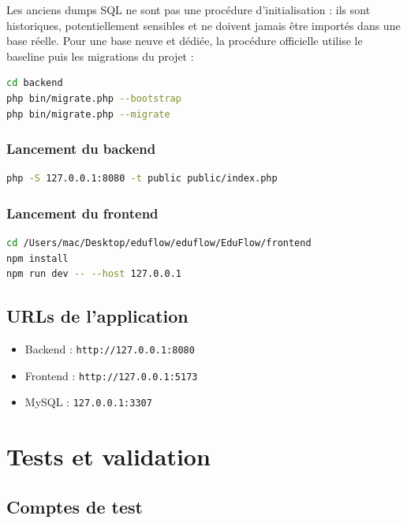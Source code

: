 \documentclass[12pt,a4paper]{report}
\begin{document}
Les anciens dumps SQL ne sont pas une procédure d'initialisation : ils sont
historiques, potentiellement sensibles et ne doivent jamais être importés dans
une base réelle. Pour une base neuve et dédiée, la procédure officielle utilise
le baseline puis les migrations du projet :

\begin{lstlisting}[language=bash]
cd backend
php bin/migrate.php --bootstrap
php bin/migrate.php --migrate
\end{lstlisting}

\subsection{Lancement du backend}

\begin{lstlisting}[language=bash]
php -S 127.0.0.1:8080 -t public public/index.php
\end{lstlisting}

\subsection{Lancement du frontend}

\begin{lstlisting}[language=bash]
cd /Users/mac/Desktop/eduflow/eduflow/EduFlow/frontend
npm install
npm run dev -- --host 127.0.0.1
\end{lstlisting}

\section{URLs de l'application}

\begin{itemize}[label=--]
    \item Backend : \texttt{http://127.0.0.1:8080}
    \item Frontend : \texttt{http://127.0.0.1:5173}
    \item MySQL : \texttt{127.0.0.1:3307}
\end{itemize}

\chapter{Tests et validation}

\section{Comptes de test}
\end{document}
